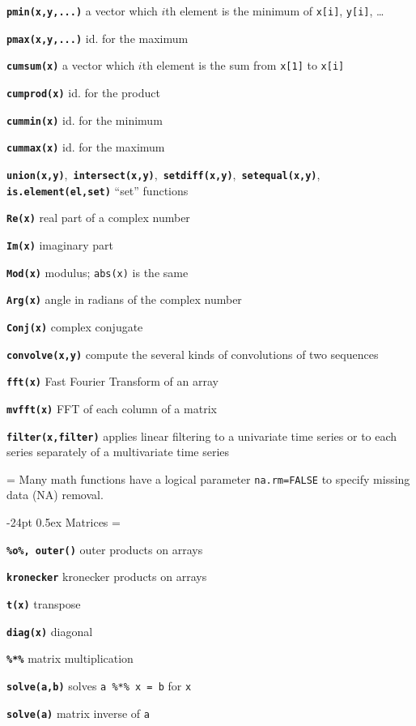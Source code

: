 \documentclass[10pt,landscape]{article}
\makeatletter
\renewcommand\section{\@startsection{section}{1}{0mm}%
                                     {-24pt}%
                                     {0.5ex}%
                                {\color{blue}\normalfont\large\bfseries}}
\newcommand{\code}{\texttt}
\newcommand{\bcode}[1]{\texttt{\textbf{#1}}}
\makeatother
\begin{document}
\begin{multicols*}{3}
\bcode{pmin(x,y,...)}  a vector which $i$th element is the minimum of \code{x[i]}, \code{y[i]}, \ldots

\bcode{pmax(x,y,...)}  id. for the maximum

\bcode{cumsum(x)}  a vector which $i$th element is the sum from \code{x[1]} to \code{x[i]}

\bcode{cumprod(x)}  id. for the product

\bcode{cummin(x)}  id. for the minimum

\bcode{cummax(x)}  id. for the maximum

\bcode{union(x,y)},~\bcode{intersect(x,y)},~\bcode{setdiff(x,y)},~\bcode{setequal(x,y)}, \bcode{is.element(el,set)} ``set'' functions

\bcode{Re(x)} real part of a complex number

\bcode{Im(x)} imaginary part

\bcode{Mod(x)} modulus; \code{abs(x)} is the same

\bcode{Arg(x)} angle in radians of the complex number

\bcode{Conj(x)} complex conjugate

\bcode{convolve(x,y)} compute the several kinds of
     convolutions of two sequences

\bcode{fft(x)} Fast Fourier Transform of an array

\bcode{mvfft(x)} FFT of each column of a matrix

\bcode{filter(x,filter)} applies linear filtering to a univariate time series or to each
     series separately of a multivariate time series

\everypar={\hangindent=0mm}
Many math functions have a logical parameter \code{na.rm=FALSE} to
specify missing data (NA) removal.

\section{Matrices}
\everypar={\hangindent=9mm}

\bcode{\%o\%, outer()} outer products on arrays

\bcode{kronecker} kronecker products on arrays

\bcode{t(x)} transpose

\bcode{diag(x)} diagonal

\bcode{\%*\%} matrix multiplication

\bcode{solve(a,b)} solves \code{a \%*\% x = b} for \code{x}

\bcode{solve(a)} matrix inverse of \code{a}


\end{multicols*}
\end{document}

